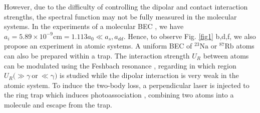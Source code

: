\documentclass[aps,prl,twocolumn,superscriptaddress,]{revtex4-1}
\begin{document}
However, due to the difficulty of controlling the dipolar and contact interaction strengths, the spectral function may not be fully measured in the molecular systems. In the experiments of a molecular BEC \cite{Bigagli2023}, we have $a_i=5.89\times10^{-9}\text{cm}=1.113a_0\ll a_{s},a_{dd}$. Hence, to observe Fig. \ref{fig1} b,d,f, we also propose an experiment in atomic systems. A uniform BEC of ${}^{23}\text{Na}$ or ${}^{87}\text{Rb}$ atoms can also be prepared within a trap. The interaction strength $U_{R}$ between atoms can be modulated using the Feshbach resonance \citep{Donley2002,PhysRevLett.115.265302,Inouye1998,RevModPhys.82.1225,Winkler2006},
regarding in which region $U_{R}(\gg\gamma\ \mathrm{or\ \ll\gamma)}$
is studied while the dipolar interaction is very weak in the atomic system. To induce the two-body loss, a perpendicular laser is
injected to the ring trap which induces photoassociation \citep{PhysRevLett.88.120403,doi:10.1126/sciadv.1701513,PhysRevLett.101.060406,PhysRevLett.121.073202,PhysRevLett.130.063001}, combining two atoms into a molecule and escape from the trap.



\end{document}
